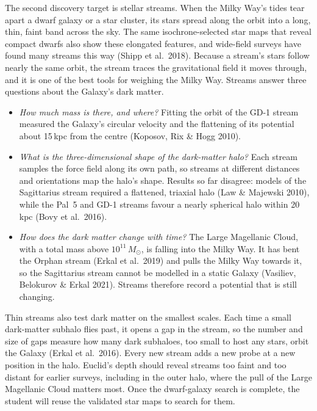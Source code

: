 \documentclass[11pt,a4paper]{article}
\begin{document}
The second discovery target is stellar streams. When the Milky Way's tides tear apart a dwarf galaxy or a star cluster, its stars spread along the orbit into a long, thin, faint band across the sky. The same isochrone-selected star maps that reveal compact dwarfs also show these elongated features, and wide-field surveys have found many streams this way (Shipp et al.\ 2018). Because a stream's stars follow nearly the same orbit, the stream traces the gravitational field it moves through, and it is one of the best tools for weighing the Milky Way. Streams answer three questions about the Galaxy's dark matter.
\begin{itemize}[leftmargin=1.2em,itemsep=0.2em,parsep=0pt,topsep=0.2em]
\item \emph{How much mass is there, and where?} Fitting the orbit of the GD-1 stream measured the Galaxy's circular velocity and the flattening of its potential about 15\,kpc from the centre (Koposov, Rix \& Hogg 2010).
\item \emph{What is the three-dimensional shape of the dark-matter halo?} Each stream samples the force field along its own path, so streams at different distances and orientations map the halo's shape. Results so far disagree: models of the Sagittarius stream required a flattened, triaxial halo (Law \& Majewski 2010), while the Pal~5 and GD-1 streams favour a nearly spherical halo within 20\,kpc (Bovy et al.\ 2016).
\item \emph{How does the dark matter change with time?} The Large Magellanic Cloud, with a total mass above $10^{11}\,M_\odot$, is falling into the Milky Way. It has bent the Orphan stream (Erkal et al.\ 2019) and pulls the Milky Way towards it, so the Sagittarius stream cannot be modelled in a static Galaxy (Vasiliev, Belokurov \& Erkal 2021). Streams therefore record a potential that is still changing.
\end{itemize}
Thin streams also test dark matter on the smallest scales. Each time a small dark-matter subhalo flies past, it opens a gap in the stream, so the number and size of gaps measure how many dark subhaloes, too small to host any stars, orbit the Galaxy (Erkal et al.\ 2016). Every new stream adds a new probe at a new position in the halo. Euclid's depth should reveal streams too faint and too distant for earlier surveys, including in the outer halo, where the pull of the Large Magellanic Cloud matters most. Once the dwarf-galaxy search is complete, the student will reuse the validated star maps to search for them.
\end{document}
